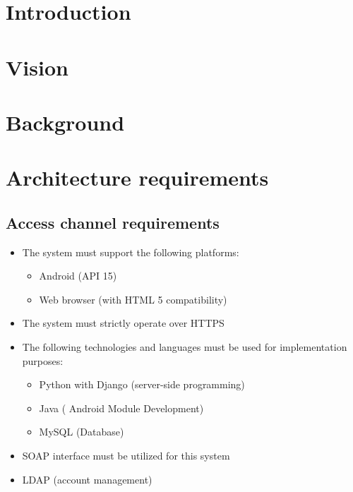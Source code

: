 \documentclass[12pt]{article}
\begin{document}
	\newpage
	\tableofcontents
	
	\newpage
	\section{Introduction}
	
		\vspace{0.2in}
	
	\section{Vision}
	
		\vspace{0.2in}
		
		
	
	\section{Background}
	
		\vspace{0.2in}
		
		
	
	\section{Architecture requirements}
	
		\vspace{0.2in}
		
		\subsection{Access channel requirements}
		
			\vspace{0.2in}
			\begin{itemize}
						\item The system must support the following platforms: 
							\begin{itemize}
								\item Android (API 15)
								\item Web browser (with HTML 5 compatibility)
							\end{itemize}
							
						\item The system must strictly operate over HTTPS
						\item The following technologies and languages must be used for implementation purposes:
							\begin{itemize}
								\item Python with Django (server-side programming)
								\item Java ( Android Module Development)
								\item MySQL (Database)
							\end{itemize}
							\item SOAP interface must be utilized for this system
							\item LDAP (account management)
			\end{itemize}
			
\end{document}
